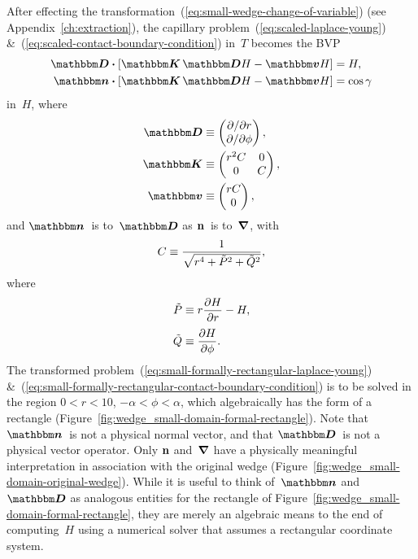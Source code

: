 After effecting the transformation~(\ref{eq:small-wedge-change-of-variable})
(see Appendix~\ref{ch:extraction}),
the capillary problem~(\ref{eq:scaled-laplace-young})
\&~(\ref{eq:scaled-contact-boundary-condition}) in~$T$
becomes the BVP
\begin{align}
  \matder \dotp \squarebr[\bulkysize]{\mat{K} \matder H - \mat{v} H}
    &= H,
    \label{eq:small-formally-rectangular-laplace-young} \\
  \mat{n} \dotp \squarebr[\bulkysize]{\mat{K} \matder H - \mat{v} H}
    &= \cos\gamma
    \label{eq:small-formally-rectangular-contact-boundary-condition}
\end{align}
in~$H$, where
\begin{align}
  \matder &\ideq
    \begin{pmatrix}
      \pd / {\pd r} \\
      \pd / {\pd\phi}
    \end{pmatrix},
    \label{eq:small-formally-rectangular-derivative} \\
  \mat{K} &\ideq
    \begin{pmatrix}
      r^2 C & 0 \\
      0 & C
    \end{pmatrix},
    \label{eq:small-formally-rectangular-diffusion-coefficient} \\
  \mat{v} &\ideq
    \begin{pmatrix}
      r C \\
      0
    \end{pmatrix},
    \label{eq:small-formally-rectangular-convection-coefficient}
\end{align}
and $\mat{n}$~is to~$\matder$ as $\mathop{}\!\boldsymbol{\mathbf{n}}$~is to~$\mathop{}\!\boldsymbol{\mathbf{\nabla}}$,
with
\begin{equation}
  C \equiv \frac{1}{\sqrt{r^4 + \tilde{P}^2 + \tilde{Q}^2}},
  \label{eq:small-formally-rectangular-scalar-coefficient}
\end{equation}
where
\begin{align}
  \desing{P} &\ideq r \pder{H}{r} - H,
    \label{eq:small-gradient-de-singularised-r-component}
    \\[\tallspace]
  \desing{Q} &\ideq \pder{H}{\phi}.
    \label{eq:small-gradient-de-singularised-phi-component}
\end{align}
The transformed problem~(\ref{eq:small-formally-rectangular-laplace-young})
\&~(\ref{eq:small-formally-rectangular-contact-boundary-condition})
is to be solved in the region
$0 < r < 10$, $-\alpha < \phi < \alpha$,
which algebraically has the form of a rectangle
(Figure~\ref{fig:wedge_small-domain-formal-rectangle}).
Note that $\mat{n}$~is not a physical normal vector,
and that $\matder$~is not a physical vector operator.
Only $\mathop{}\!\boldsymbol{\mathbf{n}}$ and~$\mathop{}\!\boldsymbol{\mathbf{\nabla}}$ have a physically meaningful interpretation
in association with the original wedge
(Figure~\ref{fig:wedge_small-domain-original-wedge}).
While it is useful to think of~$\mat{n}$ and~$\matder$
as analogous entities for the rectangle of
Figure~\ref{fig:wedge_small-domain-formal-rectangle},
they are merely an algebraic means to the end of computing~$H$
using a numerical solver that assumes a rectangular coordinate system.

